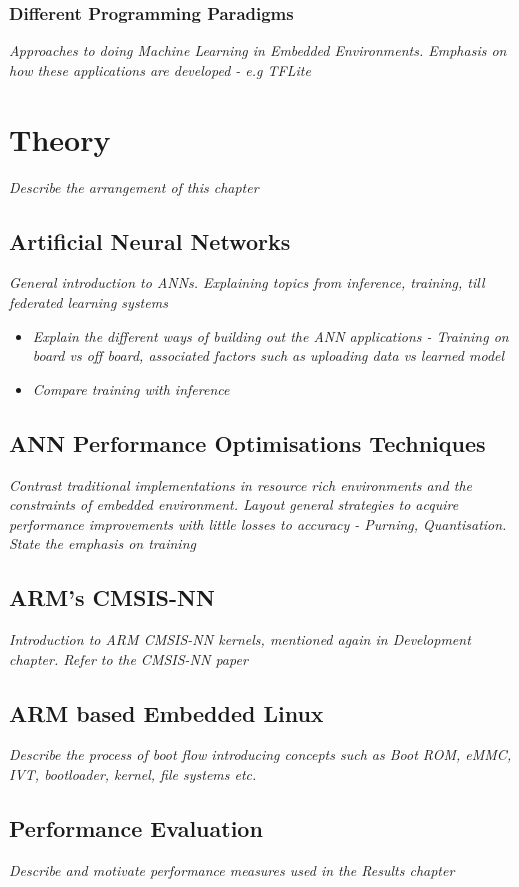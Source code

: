 \subsection{Different Programming Paradigms}
\textit{Approaches to doing Machine Learning in Embedded Environments. Emphasis on how these applications are developed - e.g TFLite}

\chapter{Theory}
{\color{blue} \textit{Describe the arrangement of this chapter}}

\section[Artificial Neural Network (ANN)]{Artificial Neural Networks}
\textit{General introduction to ANNs. Explaining topics from inference, training, till federated learning systems}

\begin{itemize}
	\item \textit{Explain the different ways of building out the ANN applications - Training on board vs off board, associated factors such as uploading data vs learned model}
	\item \textit{Compare training with inference}
\end{itemize}

\section{ANN Performance Optimisations Techniques}
\textit{Contrast traditional implementations in resource rich environments and the constraints of embedded environment. Layout general strategies to acquire performance improvements with little losses to accuracy - Purning, Quantisation. State the emphasis on training}

\section{ARM's CMSIS-NN}
\textit{Introduction to ARM CMSIS-NN kernels, mentioned again in Development chapter. Refer to the CMSIS-NN paper}

\section{ARM based Embedded Linux}
\textit{Describe the process of boot flow introducing concepts such as Boot ROM, eMMC, IVT, bootloader, kernel, file systems etc.}

\section{Performance Evaluation}
\textit{Describe and motivate performance measures used in the Results chapter}
